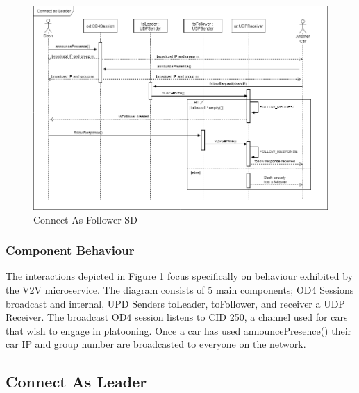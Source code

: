 \documentclass[12pt]{article}
\begin{document}
\FloatBarrier %
\begin{figure}[ht!]
\centering
\includegraphics[width=\linewidth]{Diagrams/ConnectAsFollower.png}
\caption{Connect As Follower SD}
\label{fig:connectasfollower}
\end{figure}
\FloatBarrier %

\subsubsection{Component Behaviour}
The interactions depicted in Figure \ref{fig:connectasfollower} focus specifically on behaviour exhibited by the V2V microservice. The diagram consists of 5 main components; OD4 Sessions broadcast and internal, UPD Senders toLeader, toFollower, and receiver a UDP Receiver. The broadcast OD4 session listens to CID 250, a channel used for cars that wish to engage in platooning. Once a car has used announcePresence() their car IP and group number are broadcasted to everyone on the network. \par

\subsection{Connect As Leader}
\end{document}
